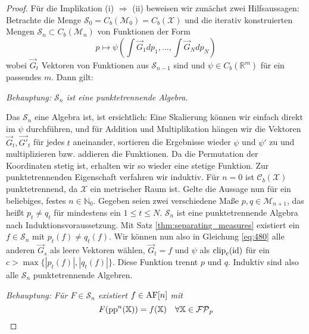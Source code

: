 \begin{proof}
        Für die Implikation (i) $\Rightarrow$ (ii) beweisen wir zunächst zwei Hilfsaussagen: Betrachte die Menge $\mathcal{S}_0= C_b(\mathcal{M}_0) = C_b(\mathcal{X})$ und die iterativ konstruierten Mengen $\mathcal{S}_n \subset C_b(\mathcal{M}_n)$ von Funktionen der Form
        \begin{equation}\label{eq:480}
            p \mapsto \psi\left( \int \vec{G}_1dp_1, ..., \int \vec{G}_N dp_N\right)
        \end{equation}
        wobei $\vec{G}_t$ Vektoren von Funktionen aus $\mathcal{S}_{n-1}$ sind und $\psi \in C_b(\mathbb{R}^m)$ für ein passendes $m$. Dann gilt: 

        \emph{Behauptung: $\mathcal{S}_n$ ist eine punktetrennende Algebra.}

        Das $\mathcal{S}_n$ eine Algebra ist, ist ersichtlich: Eine Skalierung können wir einfach direkt im $\psi$ durchführen, und für Addition und Multiplikation hängen wir die Vektoren $\vec{G}_t, \vec{G'}_t$ für jedes $t$ aneinander, sortieren die Ergebnisse wieder $\psi$ und $\psi'$ zu und multiplizieren bzw. addieren die Funktionen. Da die Permutation der Koordinaten stetig ist, erhalten wir so wieder eine stetige Funktion. Zur punktetrennenden Eigenschaft verfahren wir induktiv. Für $n=0$ ist $\mathcal{C}_b(\mathcal{X})$ punktetrennend, da $\mathcal{X}$ ein metrischer Raum ist. Gelte die Aussage nun für ein beliebiges, festes $n \in \mathbb{N}_0$. Gegeben seien zwei verschiedene Maße $p,q \in \mathcal{M}_{n+1}$, das heißt $p_t\neq q_t$ für mindestens ein $1\leq t\leq N$. $\mathcal{S}_{n}$ ist eine punktetrennende Algebra nach Induktionsvoraussetzung. Mit Satz \ref{thm:separating_measures} existiert ein $f \in \mathcal{S}_{n}$ mit $p_t(f) \neq q_t(f)$. Wir können nun also in Gleichung \ref{eq:480} alle anderen $\vec{G}_s$ als leere Vektoren wählen, $\vec{G}_t = f$ und $\psi$ als $\operatorname{clip}_c(\operatorname{id})$ für ein $c > \max\{|p_t(f)|, |q_t(f)|\}$. Diese Funktion trennt $p$ und $q$. Induktiv sind also alle $\mathcal{S}_n$ punktetrennende Algebren.

        \emph{Behauptung: Für $F\in \mathcal{S}_n$ existiert $f \in \operatorname{AF}[n]$ mit 
        $$F(\operatorname{pp}^n(\mathbb{X})) = f(\mathbb{X}) \quad \forall \mathbb{X} \in \mathcal{FP}_p$$}


\end{proof}
